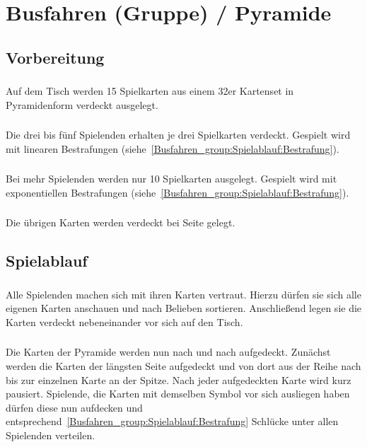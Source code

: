 \section{Busfahren (Gruppe) / Pyramide}
\subsection{Vorbereitung}
\subsubsection{}
Auf dem Tisch werden 15 Spielkarten aus einem 32er Kartenset in Pyramidenform verdeckt ausgelegt.

\subsubsection{}
Die drei bis fünf Spielenden erhalten je drei Spielkarten verdeckt. Gespielt wird mit linearen Bestrafungen (siehe~\ref{Busfahren_group:Spielablauf:Bestrafung}).

\subsubsection{}
Bei mehr Spielenden werden nur 10 Spielkarten ausgelegt. Gespielt wird mit exponentiellen Bestrafungen (siehe~\ref{Busfahren_group:Spielablauf:Bestrafung}).

\subsubsection{}
Die übrigen Karten werden verdeckt bei Seite gelegt.

\subsection{Spielablauf}
\subsubsection{}
Alle Spielenden machen sich mit ihren Karten vertraut.
Hierzu dürfen sie sich alle eigenen Karten anschauen und nach Belieben sortieren.
Anschließend legen sie die Karten verdeckt nebeneinander vor sich auf den Tisch.

\subsubsection{}
Die Karten der Pyramide werden nun nach und nach aufgedeckt.
Zunächst werden die Karten der längsten Seite aufgedeckt und von dort aus der Reihe nach bis zur einzelnen Karte an der Spitze.
Nach jeder aufgedeckten Karte wird kurz pausiert.
Spielende, die Karten mit demselben Symbol vor sich ausliegen haben dürfen diese nun aufdecken und entsprechend~\ref{Busfahren_group:Spielablauf:Bestrafung} Schlücke unter allen Spielenden verteilen.


